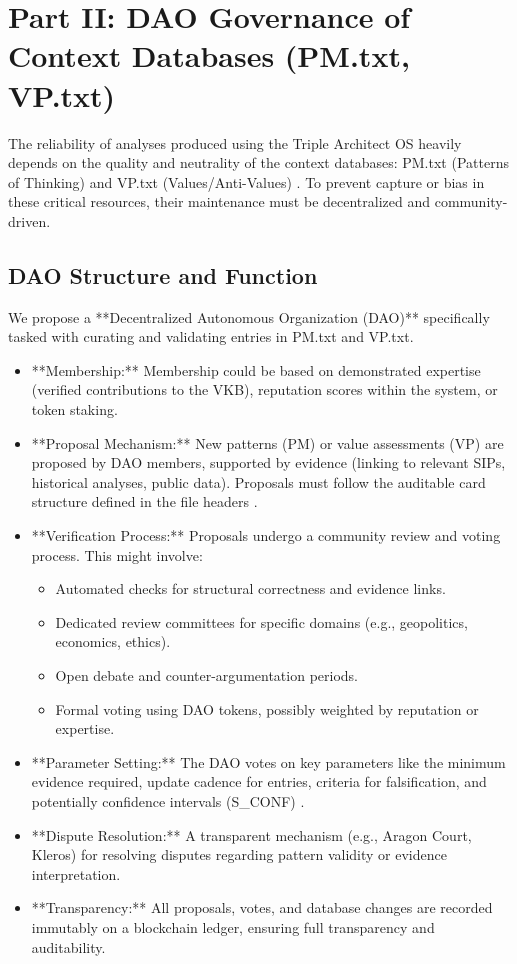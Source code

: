 \documentclass[11pt,a4paper]{article}
\theoremstyle{definition}
\theoremstyle{remark}
\begin{document}
\section{Part II: DAO Governance of Context Databases (PM.txt, VP.txt)}

The reliability of analyses produced using the Triple Architect OS heavily depends on the quality and neutrality of the context databases: PM.txt (Patterns of Thinking) and VP.txt (Values/Anti-Values) \cite{PM, VP}. To prevent capture or bias in these critical resources, their maintenance must be decentralized and community-driven.

\subsection{DAO Structure and Function}

We propose a **Decentralized Autonomous Organization (DAO)** specifically tasked with curating and validating entries in PM.txt and VP.txt.

\begin{itemize}
    \item **Membership:** Membership could be based on demonstrated expertise (verified contributions to the VKB), reputation scores within the system, or token staking.
    \item **Proposal Mechanism:** New patterns (PM) or value assessments (VP) are proposed by DAO members, supported by evidence (linking to relevant SIPs, historical analyses, public data). Proposals must follow the auditable card structure defined in the file headers \cite{PM, VP}.
    \item **Verification Process:** Proposals undergo a community review and voting process. This might involve:
        \begin{itemize}
            \item Automated checks for structural correctness and evidence links.
            \item Dedicated review committees for specific domains (e.g., geopolitics, economics, ethics).
            \item Open debate and counter-argumentation periods.
            \item Formal voting using DAO tokens, possibly weighted by reputation or expertise.
        \end{itemize}
    \item **Parameter Setting:** The DAO votes on key parameters like the minimum evidence required, update cadence for entries, criteria for falsification, and potentially confidence intervals (S\_CONF) \cite{PM}.
    \item **Dispute Resolution:** A transparent mechanism (e.g., Aragon Court, Kleros) for resolving disputes regarding pattern validity or evidence interpretation.
    \item **Transparency:** All proposals, votes, and database changes are recorded immutably on a blockchain ledger, ensuring full transparency and auditability.
\end{itemize}
\end{document}
